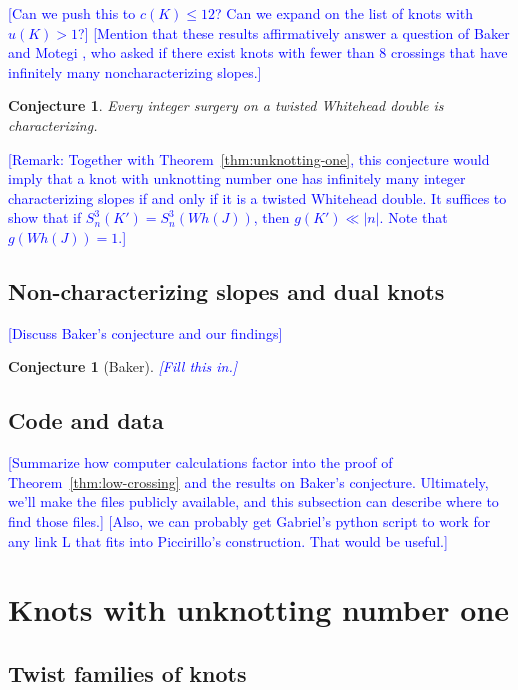 \documentclass[11pt,usenames,dvipsnames,reqno]{amsart}
\numberwithin{theorem}{section}
\newtheorem{conjecture}[theorem]{Conjecture}
\theoremstyle{ex}
\theoremstyle{rem}
\def\kh#1{\textcolor{Blue}{#1}}
\begin{document}
\kh{[Can we push this to $c(K)\leq 12$? Can we expand on the list of knots with $u(K)>1$?]} 
\kh{[Mention that these results affirmatively answer a question of Baker and Motegi \cite[Question~1.7]{baker-motegi}, who asked if there exist knots with fewer than 8 crossings that have infinitely many noncharacterizing slopes.]}


\begin{conjecture}
Every integer surgery on a twisted Whitehead double is characterizing.
\end{conjecture}

\kh{[Remark: Together with Theorem~\ref{thm:unknotting-one}, this conjecture would imply that a knot with unknotting number one has infinitely many integer characterizing slopes if and only if it is a twisted Whitehead double. It suffices to show that if $S^3_n(K')=S^3_n(Wh(J))$, then $g(K')\ll |n|$. Note that $g(Wh(J))=1$.]}






\subsection{Non-characterizing slopes and dual knots}\kh{[Discuss Baker's conjecture and our findings]}

\begin{conjecture}[Baker]
\kh{[Fill this in.]}
\end{conjecture}

\subsection{Code and data} \kh{[Summarize how computer calculations factor into the proof of Theorem~\ref{thm:low-crossing} and the results on Baker's conjecture. Ultimately, we'll make the files publicly available, and this subsection can describe where to find those files.]} \kh{[Also, we can probably get Gabriel's python script to work for any link L that fits into Piccirillo's construction. That would be useful.]}



\section{Knots with unknotting number one}\label{sec:unknotting-one}

\subsection{Twist families of knots}
\end{document}
